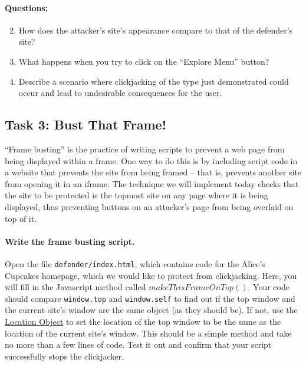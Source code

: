 \paragraph{Questions:}
\begin{enumerate}
\setcounter{enumi}{1}
    \item How does the attacker's site’s appearance compare to that of
	  the defender's site?

    \item What happens when you try to click on the ``Explore Menu'' button?

    \item Describe a scenario where clickjacking of the type just
    demonstrated could occur and lead to undesirable consequences for 
    the user.
\end{enumerate}



\subsection{Task 3: Bust That Frame!}
``Frame busting'' is the practice of writing scripts to prevent a web
page from being displayed within a frame.  One way to do this is by
including script code in a website that prevents the site from being
framed -- that is, prevents another site from opening it in an iframe.
The technique we will implement today checks that the site to be
protected is the topmost site on any page where it is being displayed,
thus preventing buttons on an attacker's page from being overlaid on top
of it. 

\paragraph{Write the frame busting script.} 

Open the file \texttt{defender/index.html}, which contains code for the
Alice's Cupcakes homepage, which we would like to protect from
clickjacking. Here, you will fill in the Javascript method called
$makeThisFrameOnTop()$. Your code should compare \texttt{window.top} and
\texttt{window.self} to find out if the top window and the current
site's window are the same object (as they should be). If not, use the
\href{https://developer.mozilla.org/en-US/docs/Web/API/Location}{Location
Object} to set the location of the top window to be the same as the
location of the current site's window. This should be a simple method
and take no more than a few lines of code. Test it out and confirm that
your script successfully stops the clickjacker. 

